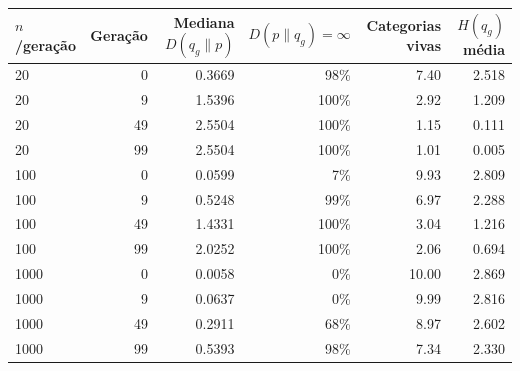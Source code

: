 \begin{tabular}{lrrrrr}
\toprule
$n$/geração & Geração & Mediana $D(q_g\|p)$ & $D(p\|q_g)=\infty$ & Categorias vivas & $H(q_g)$ média \\
\midrule
20 & 0 & 0.3669 & 98\% & 7.40 & 2.518 \\
20 & 9 & 1.5396 & 100\% & 2.92 & 1.209 \\
20 & 49 & 2.5504 & 100\% & 1.15 & 0.111 \\
20 & 99 & 2.5504 & 100\% & 1.01 & 0.005 \\
100 & 0 & 0.0599 & 7\% & 9.93 & 2.809 \\
100 & 9 & 0.5248 & 99\% & 6.97 & 2.288 \\
100 & 49 & 1.4331 & 100\% & 3.04 & 1.216 \\
100 & 99 & 2.0252 & 100\% & 2.06 & 0.694 \\
1000 & 0 & 0.0058 & 0\% & 10.00 & 2.869 \\
1000 & 9 & 0.0637 & 0\% & 9.99 & 2.816 \\
1000 & 49 & 0.2911 & 68\% & 8.97 & 2.602 \\
1000 & 99 & 0.5393 & 98\% & 7.34 & 2.330 \\
\bottomrule
\end{tabular}
